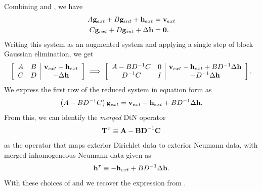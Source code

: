 Combining  and , we have
\begin{equation}
\begin{aligned}
A\mathbf g_{ext} + B\mathbf g_{int} + \mathbf h_{ext} & = \mathbf v_{ext} \\
C\mathbf g_{ext} + D\mathbf g_{int} + \Delta \mathbf h & = \mathbf 0.
\end{aligned}
\end{equation}
Writing this system as an augmented system and applying a single step of block Gaussian elimination, we get
\begin{equation}
\left[
\begin{array}{cc|c}
A & B & \mathbf v_{ext} - \mathbf h_{ext}\\
C & D & -\Delta \mathbf h\\
\end{array}\right]
\;
\Longrightarrow 
\;
\left[
\begin{array}{cc|c}
A - BD^{-1}C & 0 & \mathbf v_{ext} - \mathbf h_{ext} + B D^{-1}\Delta \mathbf h\\
D^{-1}C      & I & -D^{-1}\Delta \mathbf h
\end{array}\right].
\label{eq:reduced_system}
\end{equation}
We express the first row of the reduced system in equation form as 
\begin{equation}
\left(A - BD^{-1}C\right) \mathbf g_{ext} = \mathbf v_{ext} - \mathbf h_{ext} + B D^{-1}\Delta \mathbf h.
\label{eq:complete_ops}
\end{equation}
From this, we can identify the {\em merged} DtN operator 
\begin{equation}
\mathbf T^{\tau} \equiv \mathbf{A} - \mathbf{B} \mathbf{D}^{-1} \mathbf{C} 
\label{eq:Ttau-merged}
\end{equation}
as the operator that maps exterior Dirichlet data to exterior Neumann data, with merged inhomogeneous Neumann data given as
\begin{equation}
\mathbf h^{\tau} \equiv -\mathbf h_{ext} + B D^{-1}\Delta \mathbf h. 
\label{eq:htau-merged}
\end{equation}
With these choices of \Ttau and \htau  we recover the expression from .

